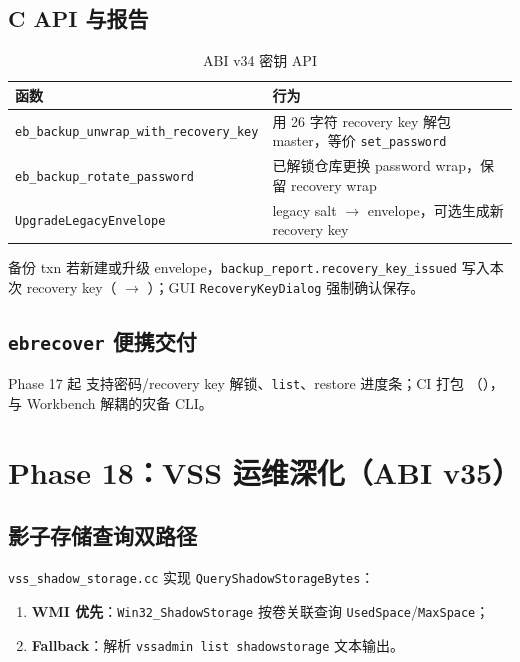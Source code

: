 \subsection{C API 与报告}

\begin{longtable}{@{}lp{9cm}@{}}
\caption{ABI v34 密钥 API} \\
\toprule
函数 & 行为 \\
\midrule
\texttt{eb\_backup\_unwrap\_with\_recovery\_key} & 用 26 字符 recovery key 解包 master，等价 \texttt{set\_password} \\
\texttt{eb\_backup\_rotate\_password} & 已解锁仓库更换 password wrap，保留 recovery wrap \\
\texttt{UpgradeLegacyEnvelope} & legacy salt $\rightarrow$ envelope，可选生成新 recovery key \\
\bottomrule
\end{longtable}

备份 txn 若新建或升级 envelope，\texttt{backup\_report.recovery\_key\_issued} 写入本次 recovery key（ $\rightarrow$ ）；GUI \texttt{RecoveryKeyDialog} 强制确认保存。

\subsection{\texttt{ebrecover} 便携交付}

Phase 17 起  支持密码/recovery key 解锁、\texttt{list}、restore 进度条；CI 打包 （），与 Workbench 解耦的灾备 CLI。

\section{Phase 18：VSS 运维深化（ABI v35）}
\label{sec:phase18-vss}

\subsection{影子存储查询双路径}

\texttt{vss\_shadow\_storage.cc} 实现 \texttt{QueryShadowStorageBytes}：

\begin{enumerate}[nosep]
  \item \textbf{WMI 优先}：\texttt{Win32\_ShadowStorage} 按卷关联查询 \texttt{UsedSpace}/\texttt{MaxSpace}；
  \item \textbf{Fallback}：解析 \texttt{vssadmin list shadowstorage} 文本输出。
\end{enumerate}

